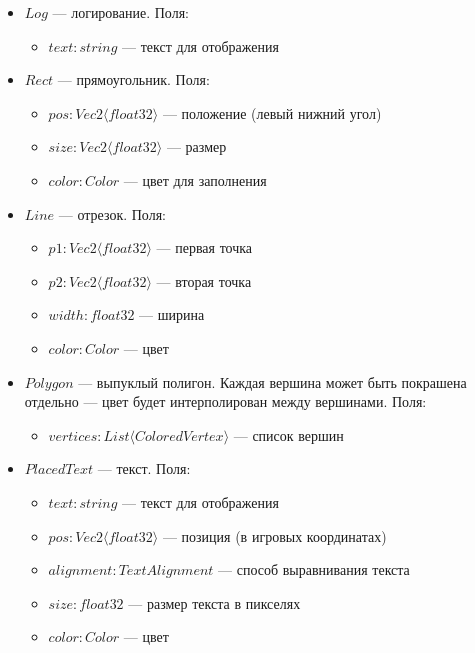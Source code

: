 \begin{itemize}
    \item $Log$ --- логирование. Поля:
        \begin{itemize}
            \item $text : string$ --- текст для отображения
        \end{itemize}
    \item $Rect$ --- прямоугольник. Поля:
        \begin{itemize}
            \item $pos : Vec2 \langle float32 \rangle$ --- положение (левый нижний угол)
            \item $size : Vec2 \langle float32 \rangle$ --- размер
            \item $color : Color$ --- цвет для заполнения
        \end{itemize}
    \item $Line$ --- отрезок. Поля:
        \begin{itemize}
            \item $p1 : Vec2 \langle float32 \rangle$ --- первая точка
            \item $p2 : Vec2 \langle float32 \rangle$ --- вторая точка
            \item $width : float32$ --- ширина
            \item $color : Color$ --- цвет
        \end{itemize}
    \item $Polygon$ --- выпуклый полигон.
        Каждая вершина может быть покрашена отдельно --- цвет будет интерполирован между вершинами. Поля:
        \begin{itemize}
            \item $vertices : List \langle ColoredVertex \rangle$ --- список вершин
        \end{itemize}
    \item $PlacedText$ --- текст. Поля:
        \begin{itemize}
            \item $text : string$ --- текст для отображения
            \item $pos : Vec2 \langle float32 \rangle$ --- позиция (в игровых координатах)
            \item $alignment : TextAlignment$ --- способ выравнивания текста
            \item $size : float32$ --- размер текста в пикселях
            \item $color: Color$ --- цвет
        \end{itemize}
\end{itemize}

